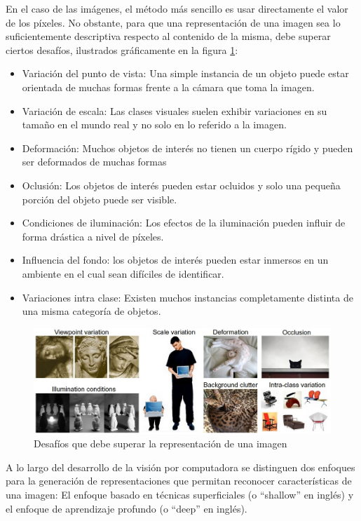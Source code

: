 \documentclass[a4paper,11pt,spanish]{book}
\begin{document}
      En el caso de las imágenes, el método más sencillo es usar directamente el valor de los píxeles. 
      No obstante, para que una representación de una imagen sea lo suficientemente descriptiva respecto al contenido de la misma, debe superar ciertos desafíos, 
      ilustrados gráficamente en la figura \ref{fig:stanford_challenges}:
      
      \begin{itemize}
	\item Variación del punto de vista: Una simple instancia de un objeto puede estar orientada de muchas formas frente a la cámara que toma la imagen.
	\item Variación de escala: Las clases visuales suelen exhibir variaciones en su tamaño en el mundo real y no solo en lo referido a la imagen.
	\item Deformación: Muchos objetos de interés no tienen un cuerpo rígido y pueden ser deformados de muchas formas
	\item Oclusión: Los objetos de interés pueden estar ocluidos y solo una pequeña porción del objeto puede ser visible.
	\item Condiciones de iluminación: Los efectos de la iluminación pueden influir de forma drástica a nivel de píxeles.
	\item Influencia del fondo: los objetos de interés pueden estar inmersos en un ambiente en el cual sean difíciles de identificar.
	\item Variaciones intra clase: Existen muchos instancias completamente distinta de una misma categoría de objetos.
      \end{itemize}
      
      \begin{figure}[h]
	\includegraphics[scale=0.5]{./img/stanford_challenges.jpeg}
	\caption{Desafíos que debe superar la representación de una imagen}
	\label{fig:stanford_challenges}
      \end{figure}

      A lo largo del desarrollo de la visión por computadora se distinguen dos enfoques para la generación de representaciones que permitan reconocer características 
      de una imagen: El enfoque basado en técnicas superficiales (o “shallow” en inglés) y el enfoque de aprendizaje profundo (o “deep” en inglés).
\end{document}
